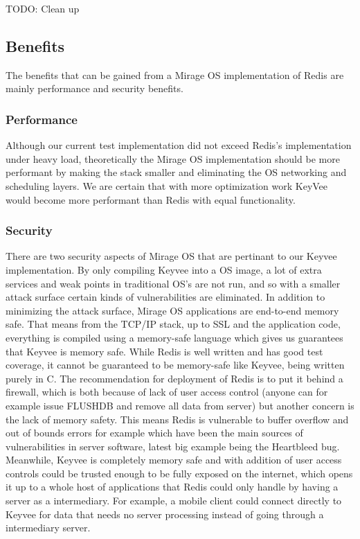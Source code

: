 \documentclass[english,10pt,twocolumn]{article}
\begin{document}
TODO: Clean up

\subsection{Benefits}

The benefits that can be gained from a Mirage OS implementation of Redis are mainly performance and security benefits.

\subsubsection{Performance}

Although our current test implementation did not exceed Redis's implementation under heavy load, theoretically the Mirage OS implementation should be more performant by making the stack smaller and eliminating the OS networking and scheduling layers. We are certain that with more optimization work KeyVee would become more performant than Redis with equal functionality.

\subsubsection{Security}

There are two security aspects of Mirage OS that are pertinant to our Keyvee implementation.
By only compiling Keyvee into a OS image, a lot of extra services and weak points in traditional OS's are not run, and so with a smaller attack surface certain kinds of vulnerabilities are eliminated.
In addition to minimizing the attack surface, Mirage OS applications are end-to-end memory safe.
That means from the TCP/IP stack, up to SSL and the application code, everything is compiled using a memory-safe language which gives us guarantees that Keyvee is memory safe.
While Redis is well written and has good test coverage, it cannot be guaranteed to be memory-safe like Keyvee, being written purely in C.
The recommendation for deployment of Redis is to put it behind a firewall, which is both because of lack of user access control (anyone can for example issue FLUSHDB and remove all data from server) but another concern is the lack of memory safety.
This means Redis is vulnerable to buffer overflow and out of bounds errors for example which have been the main sources of vulnerabilities in server software, latest big example being the Heartbleed bug.
Meanwhile, Keyvee is completely memory safe and with addition of user access controls could be trusted enough to be fully exposed on the internet, which opens it up to a whole host of applications that Redis could only handle by having a server as a intermediary.
For example, a mobile client could connect directly to Keyvee for data that needs no server processing instead of going through a intermediary server.
\end{document}
